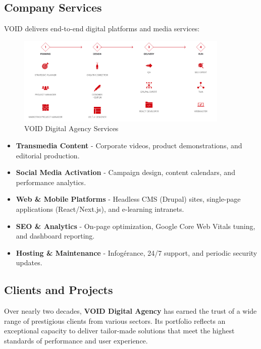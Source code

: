 \subsection{Company Services}
\noindent
VOID delivers end-to-end digital platforms and media services:
\begin{figure}[ht]
        \centering
        \includegraphics[width=0.9\textwidth]{images/void-Allservices.png}
        \caption{VOID Digital Agency Services}
        \label{fig:void-services}
      \end{figure}

\begin{itemize}
  \item \textbf{Transmedia Content} - Corporate videos, product demonstrations, and editorial production.  
  \item \textbf{Social Media Activation} - Campaign design, content calendars, and performance analytics.  
  \item \textbf{Web \& Mobile Platforms} - Headless CMS (Drupal) sites, single-page applications (React/Next.js), and e-learning intranets.  
  \item \textbf{SEO \& Analytics} - On-page optimization, Google Core Web Vitals tuning, and dashboard reporting.  
  \item \textbf{Hosting \& Maintenance} - Infogérance, 24/7 support, and periodic security updates.  
\end{itemize}

\subsection{Clients and Projects}
\noindent
Over nearly two decades, \textbf{VOID Digital Agency} has earned the trust of a wide range of prestigious clients from various sectors. Its portfolio reflects an exceptional capacity to deliver tailor-made solutions that meet the highest standards of performance and user experience.

\medskip

